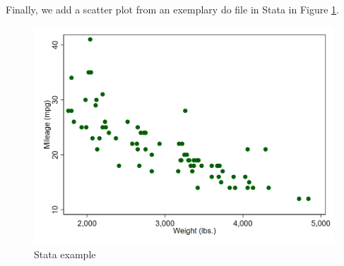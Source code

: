 \documentclass[12pt]{article}
\theoremstyle{definition}
\begin{document}
Finally, we add a scatter plot from an exemplary do file in Stata in Figure \ref{fig:auto_scatter}.

\begin{figure}[tbh!]
\centering
\includegraphics[width=.8\linewidth]{application/scatter.png}
\caption[]{Stata example}
\label{fig:auto_scatter}
\end{figure}

\newpage 



%

\end{document}
